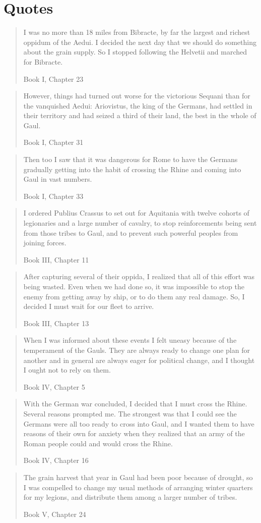 \section{Quotes}
\par

\blockquote[Book I, Chapter 23]{I was no more than 18 miles from Bibracte, by far the largest and richest oppidum of the Aedui. I decided the next day that we should do something about the grain supply. So I stopped following the Helvetii and marched for Bibracte.}

\blockquote[Book I, Chapter 31]{However, things had turned out worse for the victorious Sequani than for the vanquished Aedui: Ariovistus, the king of the Germans, had settled in their territory and had seized a third of their land, the best in the whole of Gaul.}

\blockquote[Book I, Chapter 33]{Then too I saw that it was dangerous for Rome to have the Germans gradually getting into the habit of crossing the Rhine and coming into Gaul in vast numbers.}

\blockquote[Book III, Chapter 11]{I ordered Publius Crassus to set out for Aquitania with twelve cohorts of legionaries and a large number of cavalry, to stop reinforcements being sent from those tribes to Gaul, and to prevent such powerful peoples from joining forces.}

\blockquote[Book III, Chapter 13]{After capturing several of their oppida, I realized that all of this effort was being wasted. Even when we had done so, it was impossible to stop the enemy from getting away by ship, or to do them any real damage. So, I decided I must wait for our fleet to arrive.}

\blockquote[Book IV, Chapter 5]{When I was informed about these events I felt uneasy because of the temperament of the Gauls. They are always ready to change one plan for another and in general are always eager for political change, and I thought I ought not to rely on them.}

\blockquote[Book IV, Chapter 16]{With the German war concluded, I decided that I must cross the Rhine. Several reasons prompted me. The strongest was that I could see the Germans were all too ready to cross into Gaul, and I wanted them to have reasons of their own for anxiety when they realized that an army of the Roman people could and would cross the Rhine.}

\blockquote[Book V, Chapter 24]{The grain harvest that year in Gaul had been poor because of drought, so I was compelled to change my usual methods of arranging winter quarters for my legions, and distribute them among a larger number of tribes.}


